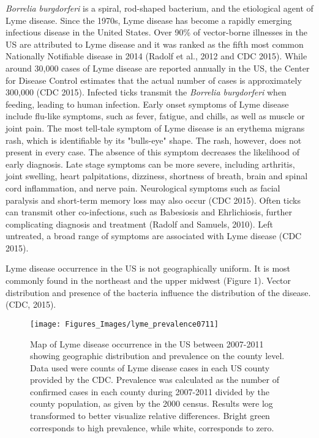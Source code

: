 \documentclass[12pt,twoside]{reedthesis}
\begin{document}
	\textit{Borrelia burgdorferi} is a spiral, rod-shaped bacterium, and the etiological agent of Lyme disease. Since the 1970s, Lyme disease has become a rapidly emerging infectious disease in the United States. Over 90\% of vector-borne illnesses in the US are attributed to Lyme disease and it was ranked as the fifth most common Nationally Notifiable disease in 2014 (Radolf et al., 2012 and CDC 2015). While around 30,000 cases of Lyme disease are reported annually in the US, the Center for Disease Control estimates that the actual  number of cases is approximately 300,000 (CDC 2015). Infected ticks transmit the \textit{Borrelia burgdorferi} when feeding, leading to human infection. Early onset symptoms of Lyme disease include flu-like symptoms, such as fever, fatigue, and chills, as well as muscle or joint pain. The most tell-tale symptom of Lyme disease is an erythema migrans rash, which is identifiable by its "bulls-eye" shape. The rash, however, does not present in every case. The absence of this symptom decreases the likelihood of early diagnosis. Late stage symptoms can be more severe, including arthritis, joint swelling, heart palpitations, dizziness, shortness of breath, brain and spinal cord inflammation, and nerve pain. Neurological symptoms such as facial paralysis and short-term memory loss may also occur (CDC 2015). Often ticks can transmit other co-infections, such as Babesiosis and Ehrlichiosis, further complicating diagnosis and treatment (Radolf and Samuels, 2010). Left untreated, a broad range of symptoms are associated with Lyme disease (CDC 2015). 
	
	Lyme disease occurrence in the US is not geographically uniform. It is most commonly found in the northeast and the upper midwest (Figure 1).  Vector distribution and presence of the bacteria influence the distribution of the disease. (CDC, 2015).
		 	 	\begin{figure}[h]
		 	 		
		 	 		\centering
		 	 		\texttt{[image: Figures\_Images/lyme\_prevalence0711]}
		 	 		\caption[Map of Lyme disease occurrence in the US between 2007-2011 showing geographic distribution and prevalence on the county level]{Map of Lyme disease occurrence in the US between 2007-2011 showing geographic distribution and prevalence on the county level. Data used were counts of Lyme disease cases in each US county provided by the CDC. Prevalence was calculated as the number of confirmed cases in each county during 2007-2011 divided by the county population, as given by the 2000 census. Results were log transformed to better visualize relative differences. Bright green corresponds to high prevalence, while white, corresponds to zero.}
		 	 		\label{Lymemap}
		 	 	\end{figure}
 	 	
\end{document}
